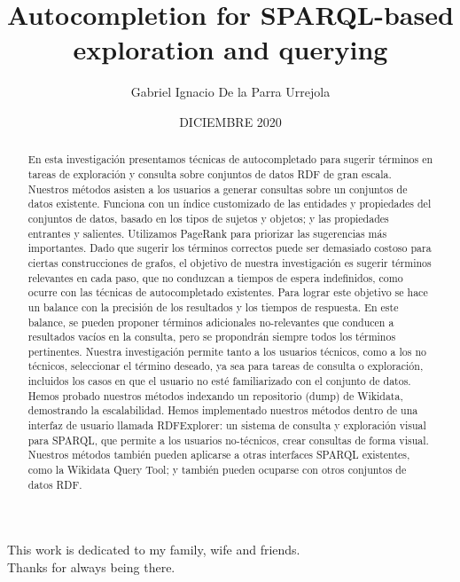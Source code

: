 \documentclass[upright, contnum]{umemoria}
\author{Gabriel Ignacio De la Parra Urrejola}
\title{Autocompletion for SPARQL-based exploration and querying}
\date{DICIEMBRE 2020}
\begin{document}
\frontmatter
\maketitle

\begin{abstract}
En esta investigación presentamos técnicas de autocompletado para sugerir términos en tareas de exploración y consulta sobre conjuntos de datos RDF de gran escala. 
Nuestros métodos asisten a los usuarios a generar consultas sobre un conjuntos de datos existente.
Funciona con un índice customizado de las entidades y propiedades del conjuntos de datos, basado en los tipos de sujetos y objetos; y las propiedades entrantes y salientes.
Utilizamos PageRank para priorizar las sugerencias más importantes. 
Dado que sugerir los términos correctos puede ser demasiado costoso para ciertas construcciones de grafos, el objetivo de nuestra investigación es sugerir términos relevantes en cada paso, que no conduzcan a tiempos de espera indefinidos, como ocurre con las técnicas de autocompletado existentes.
Para lograr este objetivo se hace un balance con la precisión de los resultados y los tiempos de respuesta. 
En este balance, se pueden proponer términos adicionales no-relevantes que conducen a resultados vacíos en la consulta, pero se propondrán siempre todos los términos pertinentes.
Nuestra investigación permite tanto a los usuarios técnicos, como a los no técnicos, seleccionar el término deseado, ya sea para tareas de consulta o exploración, incluidos los casos en que el usuario no esté familiarizado con el conjunto de datos.
Hemos probado nuestros métodos indexando un repositorio (dump) de Wikidata, demostrando la escalabilidad. 
Hemos implementado nuestros métodos dentro de una interfaz de usuario llamada RDFExplorer: un sistema de consulta y exploración visual para SPARQL, que permite a los usuarios no-técnicos, crear consultas de forma visual. 
Nuestros métodos también pueden aplicarse a otras interfaces SPARQL existentes, como la Wikidata Query Tool; y también pueden ocuparse con otros conjuntos de datos RDF.
\end{abstract}

\begin{dedicatoria} %
This work is dedicated to my family, wife and friends.\\
Thanks for always being there.
\end{dedicatoria}


\cleardoublepage

\tableofcontents
\listoftables %
\listoffigures %

\mainmatter














\end{document}
